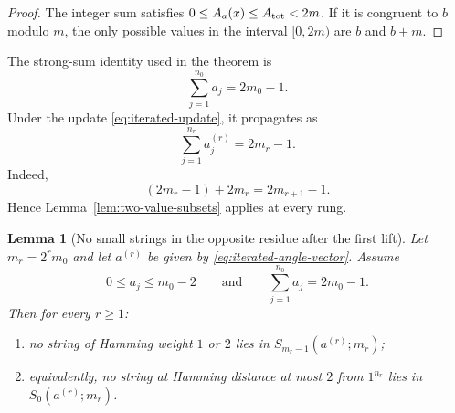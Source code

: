 \documentclass[11pt]{article}
\newtheorem{lemma}[theorem]{Lemma}
\begin{document}
\begin{proof}
The integer sum satisfies $0\le A_a(x)\le A_{\rm tot}<2m$.  If it is congruent to $b$ modulo
$m$, the only possible values in the interval $[0,2m)$ are $b$ and $b+m$.
\end{proof}

The strong-sum identity used in the theorem is
\begin{equation}
  \sum_{j=1}^{n_0}a_j=2m_0-1.
  \label{eq:strong-sum-identity}
\end{equation}
Under the update \eqref{eq:iterated-update}, it propagates as
\begin{equation}
  \sum_{j=1}^{n_r}a^{(r)}_j=2m_r-1.
  \label{eq:strong-sum-propagates}
\end{equation}
Indeed,
\[
  (2m_r-1)+2m_r=2m_{r+1}-1.
\]
Hence Lemma~\ref{lem:two-value-subsets} applies at every rung.

\begin{lemma}[No small strings in the opposite residue after the first lift]
\label{lem:no-small-weight-Smr1}
Let $m_r=2^r m_0$ and let $a^{(r)}$ be given by \eqref{eq:iterated-angle-vector}.  Assume
\begin{equation}
  0\le a_j\le m_0-2
  \qquad\text{and}\qquad
  \sum_{j=1}^{n_0}a_j=2m_0-1.
  \label{eq:no-small-weight-hyp}
\end{equation}
Then for every $r\ge1$:
\begin{enumerate}[label=\textup{(\roman*)}]
\item no string of Hamming weight $1$ or $2$ lies in $S_{m_r-1}(a^{(r)};m_r)$;
\item equivalently, no string at Hamming distance at most $2$ from $1^{n_r}$ lies in
$S_0(a^{(r)};m_r)$.
\end{enumerate}
\end{lemma}
\end{document}
